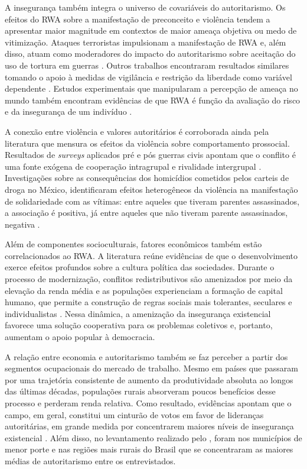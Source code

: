 \documentclass[
12pt,				%
openright,			%
twoside,			%
a4paper,			%
english,			%
french,				%
spanish,			%
brazil				%
]{abntex2}
\begin{document}
A insegurança também integra o universo de covariáveis do autoritarismo. Os efeitos do RWA sobre a manifestação de preconceito e violência tendem a apresentar maior magnitude em contextos de maior ameaça objetiva ou medo de vitimização. Ataques terroristas impulsionam a manifestação de RWA e, além disso, atuam como moderadores do impacto do autoritarismo sobre aceitação do uso de tortura em guerras \cite{linden2018terror}. Outros trabalhos encontraram resultados similares tomando o apoio à medidas de vigilância e restrição da liberdade como variável dependente \cite{cohrs2005effects}. Estudos experimentais que manipularam a percepção de ameaça no mundo também encontram evidências de que RWA é função da avaliação do risco e da insegurança de um indivíduo \cite{duckitt2003impact,sibley2007effects}.

A conexão entre violência e valores autoritários é corroborada ainda pela literatura que mensura os efeitos da violência sobre comportamento prossocial. Resultados de \emph{surveys} aplicados pré e pós guerras civis apontam que o conflito é uma fonte exógena de cooperação intragrupal e rivalidade intergrupal  \cite{bauer2016can,bauer2018trusting}. Investigações sobre as consequências dos homicídios cometidos pelos carteis de droga no México, identificaram efeitos heterogêneos da violência na manifestação de solidariedade com as vítimas: entre aqueles que tiveram parentes assassinados, a associação é positiva, já entre aqueles que não tiveram parente assassinados, negativa \cite{schedler2014collapse,schedler2016criminal}.

Além de componentes socioculturais, fatores econômicos também estão correlacionados ao RWA. A literatura reúne evidências de que o desenvolvimento exerce efeitos profundos sobre a cultura política das sociedades. Durante o processo de modernização, conflitos redistributivos são amenizados por meio da elevação da renda média e as populações experienciam a formação de capital humano, que permite a construção de regras sociais mais tolerantes, seculares e individualistas \cite{sullivan1999psychological, inglehart2005modernization}. Nessa dinâmica, a amenização da insegurança existencial favorece uma solução cooperativa para os problemas coletivos e, portanto, aumentam o apoio popular à democracia.

A relação entre economia e autoritarismo também se faz perceber a partir dos segmentos ocupacionais do mercado de trabalho. Mesmo em países que passaram por uma trajetória consistente de aumento da produtividade absoluta ao longos das últimas décadas, populações rurais absorveram poucos benefícios desse processo e perderam renda relativa. Como resultado, evidências apontam que o campo, em geral, constitui um cinturão de votos em favor de lideranças autoritárias, em grande medida por concentrarem maiores níveis de insegurança existencial \cite{ballard2017economic, norris2019cultural, mamonova2019populism, berlet2019rural,mamonova2019understanding}. Além disso, no levantamento realizado pelo , foram nos municípios de menor porte e nas regiões mais rurais do Brasil que se concentraram as maiores médias de autoritarismo entre os entrevistados.
\end{document}
